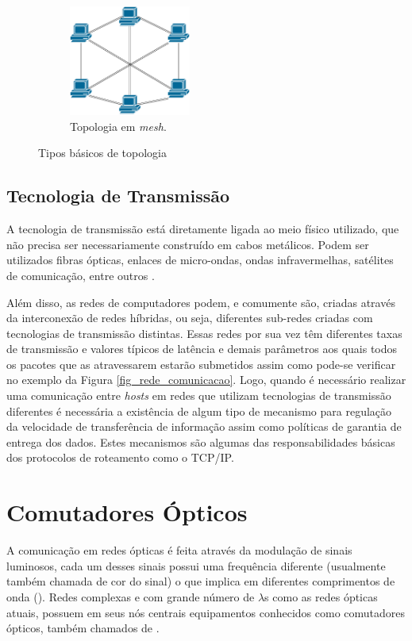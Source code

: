 \begin{figure}[t!]
\begin{subfigure}[t]{0.4\textwidth}
	\end{subfigure}
	~
	\begin{subfigure}[t]{0.4\textwidth}
		\centering
		\includegraphics[width=4cm]{./figuras/Topologia-Mesh.pdf} %
	\caption{Topologia em \emph{mesh}.}
	\label{fig_topologia_multiplo_mesh}
	\end{subfigure}
	\caption{Tipos básicos de topologia}
	\label{fig_topologia_multiplo}
\end{figure}

\subsection{Tecnologia de Transmissão}
A tecnologia de transmissão está diretamente ligada ao meio físico utilizado, que não precisa ser necessariamente construído em cabos metálicos. Podem ser utilizados fibras ópticas, enlaces de micro-ondas, ondas infravermelhas, satélites de comunicação, entre outros \cite{Book-Tanenbaum2003}. 

Além disso, as redes de computadores podem, e comumente são, criadas através da interconexão de redes híbridas, ou seja, diferentes sub-redes criadas com tecnologias de transmissão distintas. Essas redes por sua vez têm diferentes taxas de transmissão e valores típicos de latência e demais parâmetros aos quais todos os pacotes que as atravessarem estarão submetidos \cite{Book-Kurose2013} assim como pode-se verificar no exemplo da Figura \ref{fig_rede_comunicacao}. Logo, quando é necessário realizar uma comunicação entre \emph{hosts} em redes que utilizam tecnologias de transmissão diferentes é necessária a existência de algum tipo de mecanismo para regulação da velocidade de transferência de informação assim como políticas de garantia de entrega dos dados. Estes mecanismos são algumas das responsabilidades básicas dos protocolos de roteamento como o TCP/IP.

\section{Comutadores Ópticos}
A comunicação em redes ópticas é feita através da modulação de sinais luminosos, cada um desses sinais possui uma frequência diferente (usualmente também chamada de cor do sinal) o que implica em diferentes comprimentos de onda (). Redes complexas e com grande número de $\lambda$s  como as redes ópticas atuais, possuem em seus nós centrais equipamentos conhecidos como comutadores ópticos, também chamados de . 

